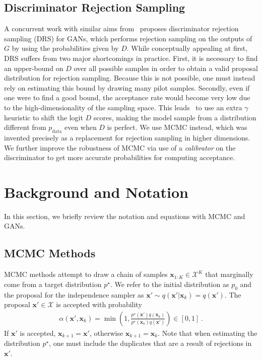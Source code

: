\documentclass{article}
\renewcommand{\vec}[1]{{\boldsymbol{\mathbf{#1}}}} %
\newcommand{\set}[1]{\mathcal{#1}}
\newcommand{\sample}{\sim}
\newcommand{\given}{|}
\newcommand{\target}{{p^\star}}
\newcommand{\prop}{q}
\newcommand{\pinit}{{p_0}}
\newcommand{\PR}{{p_{\textrm{data}}}}
\newcommand{\accept}{\alpha}
\newcommand{\setx}{\set{X}}
\begin{document}
\subsection{Discriminator Rejection Sampling}
A concurrent work with similar aims from~\citet{Azadi2018} proposes discriminator rejection sampling (DRS) for GANs, which performs rejection sampling on the outputs of $G$ by using the probabilities given by $D$.
While conceptually appealing at first, DRS suffers from two major shortcomings in practice.
First, it is necessary to find an upper-bound on $D$ over all possible samples in order to obtain a valid proposal distribution for rejection sampling.
Because this is not possible, one must instead rely on estimating this bound by drawing many pilot samples.
Secondly, even if one were to find a good bound, the acceptance rate would become very low due to the high-dimensionality of the sampling space.
This leads~\citet{Azadi2018} to use an extra $\gamma$ heuristic to shift the logit $D$ scores, making the model sample from a distribution different from $\PR$ even when $D$ is perfect.
We use MCMC instead, which was invented precisely as a replacement for rejection sampling in higher dimensions.
We further improve the robustness of MCMC via use of a \emph{calibrator} on the discriminator to get more accurate probabilities for computing acceptance.  %

\section{Background and Notation}
\label{sec:Background}

In this section, we briefly review the notation and equations with MCMC and GANs.

\subsection{MCMC Methods}
\label{sec:MCMC Methods}

MCMC methods attempt to draw a chain of samples $\vec x_{1:K} \in \setx^K$ that marginally come from a target distribution $\target$.
We refer to the initial distribution as $\pinit$ and the proposal for the independence sampler as $\vec x' \sample \prop(\vec x' \given \vec x_k)=\prop(\vec x')$.
The proposal $\vec x' \in \setx$ is accepted with probability
\begin{align}
  \accept(\vec x', \vec x_k) = \min\left(1, \frac{\target(\vec x')\prop(\vec x_k)}{\target(\vec x_k)\prop(\vec x')}\right) \in [0,1]\,. \label{eq:alpha def}
\end{align}
If $\vec x'$ is accepted, $\vec x_{k+1} = \vec x'$, otherwise $\vec x_{k+1} = \vec x_k$.
Note that when estimating the distribution $\target$, one must include the duplicates that are a result of rejections in $\vec x'$.
\end{document}
